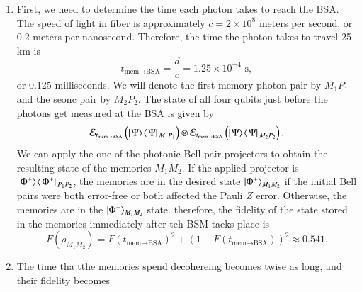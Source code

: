 \begin{solution}
\begin{enumerate}[label=(\alph*)]
\begin{align*}
    \end{align*}
    The Pauli operator $Z\otimes I$ takes the initial state \ket{\Psi} to an orthogonal state,
    \begin{equation*}
        Z \otimes I \ket{\Psi} = \frac{1}{\sqrt{2}} \left( \ket{\uparrow,V} - \ket{\downarrow,H} \right).
    \end{equation*}
    This means that $\bra{\Psi} Z \otimes I \ket{\Psi} = 0$, leading tothe following expression for the fidelity,
    \begin{equation*}
        F(t) = \frac{1 + e^{-t/T_2}}{2}.
    \end{equation*}
    \item First, we need to determine the time each photon takes to reach the BSA. The speed of light in fiber is approximately $c=2\times10^8$ meters per second, or 0.2 meters per nanosecond. Therefore, the time the photon takes to travel 25 km is
    \begin{equation*}
        t_{\text{mem}\rightarrow\text{BSA}} = \frac{d}{c} = 1.25\times10^{-4} \text{ s},
    \end{equation*}
    or 0.125 milliseconds.
    We will denote the first memory-photon pair by $M_1P_1$ and the seonc pair by $M_2P_2$. The state of all four qubits just before the photons get measured at the BSA is given by
    \begin{equation*}
        \mathcal{E}_{t_{\text{mem}\rightarrow\text{BSA}}} \left( \left|\left. \Psi \rangle\right.\!\langle\left. \Psi \right|\right. _{M_1P_1} \right) \otimes \mathcal{E}_{t_{\text{mem}\rightarrow\text{BSA}}} \left( \left|\left. \Psi \rangle\right.\!\langle\left. \Psi \right|\right. _{M_2P_2} \right).
    \end{equation*}
    We can apply the one of the photonic Bell-pair projectors to obtain the resulting state of the memories $M_1M_2$.
    If the applied projector is $\left|\left. \Phi^+ \rangle\right.\!\langle\left. \Phi^+ \right|\right. _{P_1P_2}$, the memories are in the desired state $\left| \Phi^+ \right\rangle_{M_1M_2}$ if the initial Bell pairs were both error-free or both affected the Pauli $Z$ error.
    Otherwise, the memories are in the $\left| \Phi^- \right\rangle_{M_1M_2}$ state.
    therefore, the fidelity of the state stored in the memories immediately after teh BSM taeks place is
    \begin{equation*}
        F(\rho_{M_1M_2}) = F(t_{\text{mem}\rightarrow\text{BSA}})^2 + (1-F(t_{\text{mem}\rightarrow\text{BSA}}))^2 \approx 0.541.
    \end{equation*}
    \item The time tha tthe memories spend decohereing becomes twise as long, and their fidelity becomes
    \begin{equation*}

\end{equation*}
\end{enumerate}
\end{solution}
